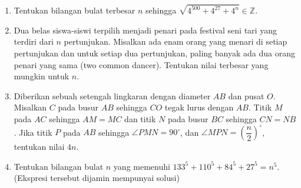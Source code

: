 \documentclass[12pt]{scrartcl}
\begin{document}
\begin{enumerate}[resume]
		\item Tentukan bilangan bulat terbesar $n$ sehingga $\sqrt{4^{500}+4^{27}+4^{n}}\in \mathbb{Z}$.
		
		\item Dua belas siswa-siswi terpilih menjadi penari pada festival seni tari yang terdiri dari $n$ pertunjukan. Misalkan ada enam orang yang menari di setiap pertunjukan dan untuk setiap dua pertunjukan, paling banyak ada dua orang penari yang sama (two common dancer). Tentukan nilai terbesar yang mungkin untuk $n$.
		
		\item Diberikan sebuah setengah lingkaran dengan diameter $AB$ dan pusat $O$. Misalkan $C$ pada busur $AB$ sehingga $CO$ tegak lurus dengan $AB$. Titik $M$ pada $AC$ sehingga $AM=MC$ dan titik $N$ pada busur $BC$ sehingga $CN=NB$. Jika titik $P$ pada $AB$ sehingga $\angle PMN = 90^\circ$, dan $\angle MPN = \left(\dfrac{n}{2}\right)^\circ$, tentukan nilai $4n$.
		
		\item Tentukan bilangan bulat $n$ yang memenuhi $133^5+110^5+84^5+27^5=n^5$. (Ekspresi tersebut dijamin mempunyai solusi)
\end{enumerate}
\end{document}
